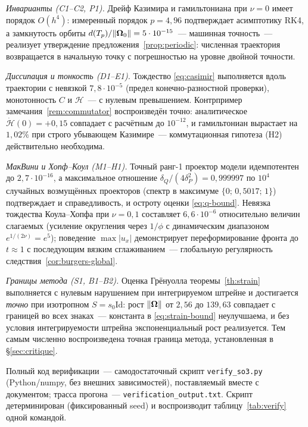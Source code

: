 \emph{Инварианты (C1--C2, P1).} Дрейф Казимира и гамильтониана при
$\nu = 0$ имеет порядок $O(h^4)$: измеренный порядок $p = 4{,}96$
подтверждает асимптотику RK4, а замкнутость орбиты
$d(T_p)/\|\boldsymbol{\Omega}_0\| = 5\cdot10^{-15}$~--- машинная точность~---
реализует утверждение предложения~\ref{prop:periodic}: численная
траектория возвращается в начальную точку с погрешностью на уровне
двойной точности.

\emph{Диссипация и тонкость (D1--E1).} Тождество
\eqref{eq:casimir} выполняется вдоль траектории с невязкой
$7{,}8\cdot10^{-5}$ (предел конечно-разностной проверки), монотонность
$C$ и $\mathcal H$~--- с нулевым превышением. Контрпример
замечания~\ref{rem:commutator} воспроизведён точно: аналитическое
$\dot{\mathcal H}(0) = +0{,}15$ совпадает с расчётным до $10^{-12}$,
и гамильтониан вырастает на $1{,}02\%$ при строго убывающем Казимире~---
коммутационная гипотеза \textup{(H2)} действительно необходима.

\emph{МакВини и Хопф--Коул (M1--H1).} Точный ранг-1 проектор модели
идемпотентен до $2{,}7\cdot10^{-16}$, а максимальное отношение
$\delta_Q/(4\delta_P^2) = 0{,}999997$ по $10^4$ случайных возмущённых
проекторов (спектр в максимуме $\{0;\,0{,}5017;\,1\}$) подтверждает
и справедливость, и остроту оценки \eqref{eq:q-bound}. Невязка
тождества Коула--Хопфа при $\nu = 0{,}1$ составляет $6{,}6\cdot10^{-6}$
относительно величин слагаемых (усиление округления через $1/\phi$ с
динамическим диапазоном $e^{1/(2\nu)} = e^5$); поведение
$\max|u_x|$ демонстрирует переформирование фронта до $t\approx1$ с
последующим вязким сглаживанием~--- глобальную регулярность
следствия~\ref{cor:burgers-global}.

\emph{Границы метода (S1, B1--B2).} Оценка Грёнуолла
теоремы~\ref{th:strain} выполняется с нулевым нарушением при
интегрируемом штрейне и достигается \emph{точно} при изотропном
$S = s_0\mathrm{Id}$: рост $\|\boldsymbol{\Omega}\|$ от $2{,}56$ до $139{,}63$
совпадает с границей во всех знаках~--- константа в \eqref{eq:strain-bound}
неулучшаема, и без условия интегрируемости штрейна экспоненциальный
рост реализуется. Тем самым численно воспроизведена точная граница
метода, установленная в \S\ref{sec:critique}.

Полный код верификации~--- самодостаточный скрипт
\texttt{verify\_\allowbreak so3.py} (Python/numpy, без внешних зависимостей),
поставляемый вместе с документом; трасса прогона~---
\texttt{verification\_\allowbreak output.txt}. Скрипт детерминирован
(фиксированный seed) и воспроизводит таблицу~\ref{tab:verify} одной
командой.
